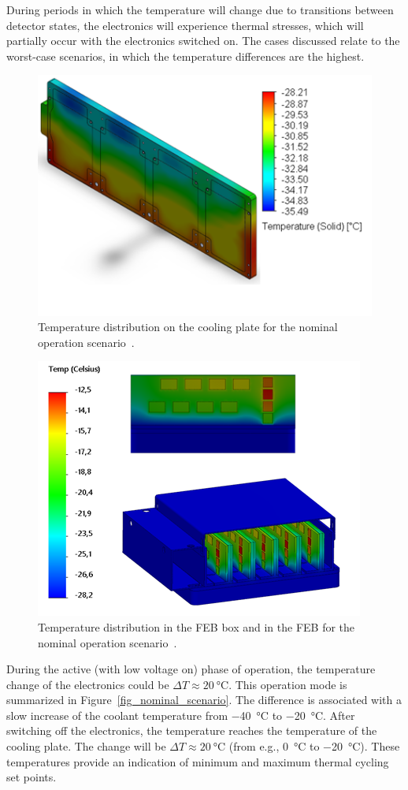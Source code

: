 During periods in which the temperature will change due to transitions between detector states, the electronics will experience thermal stresses, which will partially occur with the electronics switched on. The cases discussed relate to the worst-case scenarios, in which the temperature differences are the highest. 
    
\begin{figure}[!h]
\centering
\includegraphics[width=0.6\columnwidth]{Chapter4/images/cooling_block_nominal.png}
\caption{Temperature distribution on the cooling plate for the nominal operation scenario~\cite{Agarwal}.}
\label{fig_coolinkg_block_nominal}
\end{figure}

\newpage

\begin{figure}[!h]
\centering
\includegraphics[width=0.62\columnwidth]{Chapter4/images/nominal_febs.png}
\caption{Temperature distribution in the \gls{FEB} box and in the \gls{FEB} for the nominal operation scenario~\cite{Agarwal}.}
\label{fig_nominal_febs}
\end{figure}


During the active (with low voltage on) phase of operation, the temperature change of the electronics could be $\Delta T \approx \SI{20}{\celsius}$. This operation mode is summarized in Figure~\ref{fig_nominal_scenario}.  The difference is associated with a slow increase of the coolant temperature from \SI{-40}{\celsius} to \SI{-20}{\celsius}. After switching off the electronics, the temperature reaches the temperature of the cooling plate. The change will be $\Delta T \approx \SI{20}{\celsius}$ (from e.g., \SI{0}{\celsius} to \SI{-20}{\celsius}). These temperatures provide an indication of minimum and maximum thermal cycling set points.  

